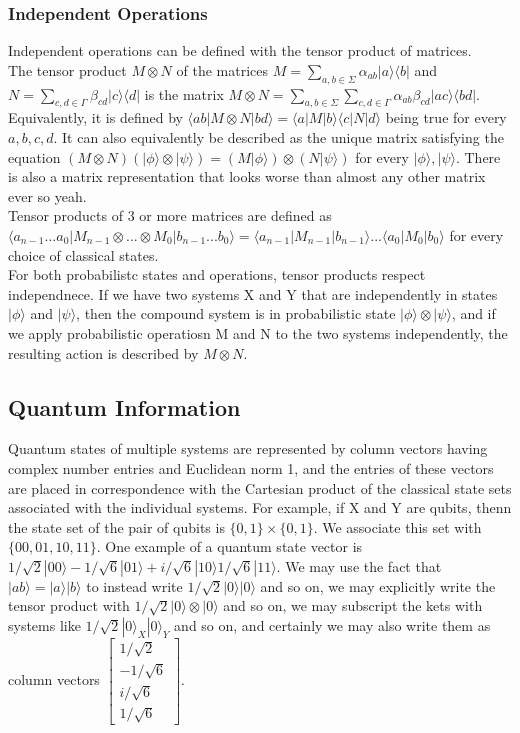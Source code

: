 \documentclass{amsart}
\begin{document}
\subsubsection*{Independent Operations}
Independent operations can be defined with the tensor product of matrices. \\
The tensor product $ M \otimes N $ of the matrices
$ M = \sum_{a,b \in \Sigma} \alpha_{ab} |a\rangle \langle b| $ and
$ N = \sum_{c,d \in \Gamma} \beta_{cd}|c\rangle \langle d| $ is the matrix
$ M \otimes N = \sum_{a,b \in \Sigma} \sum_{c,d \in \Gamma}  \alpha_{ab}\beta_{cd}|ac\rangle
\langle bd| $. Equivalently, it is defined by
$ \langle ab|M \otimes N |bd\rangle = \langle a|M|b\rangle \langle c|N|d\rangle $ being true
for every $ a,b,c,d $. It can also equivalently be described as the unique matrix satisfying
the equation $ (M \otimes N)(|\phi \rangle \otimes |\psi \rangle) = (M|\phi \rangle) \otimes
(N |\psi \rangle) $ for every $ |\phi \rangle, |\psi \rangle $. There is also a matrix
representation that looks worse than almost any other matrix ever so yeah. \\
Tensor products of 3 or more matrices are defined as
$ \langle a_{n-1}...a_0|M_{n-1} \otimes ... \otimes M_0|b_{n-1}...b_0 \rangle =
\langle a_{n-1}|M_{n-1}|b_{n-1} \rangle ... \langle a_0|M_0|b_0 \rangle $ for every choice of
classical states. \\
For both probabilistc states and operations, tensor products respect independnece. If we have
two systems X and Y that are independently in states $ |\phi \rangle $ and $ |\psi \rangle $,
then the compound system is in probabilistic state $ |\phi \rangle \otimes |\psi \rangle $,
and if we apply probabilistic operatiosn M and N to the two systems independently, the
resulting action is described by $ M \otimes N $. \\
\subsection*{Quantum Information}
Quantum states of multiple systems are represented by column vectors having complex number
entries and Euclidean norm 1, and the entries of these vectors are placed in correspondence
with the Cartesian product of the classical state sets associated with the individual systems.
For example, if X and Y are qubits, thenn the state set of the pair of qubits is
$ \{0,1\} \times \{0,1\} $. We associate this set with $ \{00,01,10,11\} $. One example of a
quantum state vector is $ 1/\sqrt{2}|00\rangle - 1/\sqrt{6}|01\rangle + i/\sqrt{6} |10\rangle
1/\sqrt{6}|11\rangle $. We may use the fact that $ |ab\rangle = |a\rangle |b\rangle $ to
instead write $ 1/\sqrt{2}|0\rangle |0\rangle $ and so on, we may explicitly write the tensor
product with $ 1/\sqrt{2}|0\rangle \otimes |0\rangle $ and so on, we may subscript the kets
with systems like $ 1/\sqrt{2}|0\rangle_X |0 \rangle_Y $ and so on, and certainly we may also
write them as column vectors $ \begin{bmatrix}
    1/\sqrt{2} \\ -1/\sqrt{6} \\ i/\sqrt{6} \\ 1/\sqrt{6}
\end{bmatrix} $. \\
\end{document}
